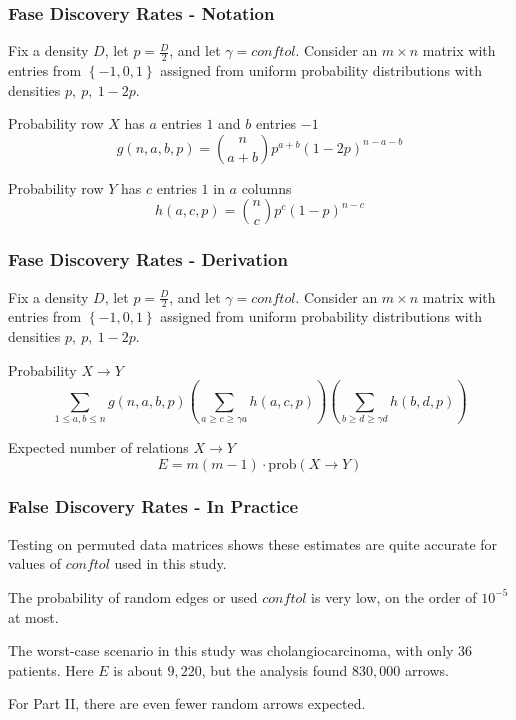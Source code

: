 \documentclass[
	11pt, %
]{beamer}
\begin{document}
\begin{frame}
    \frametitle{Fase Discovery Rates - Notation}
    Fix a density $D$, let $p=\frac{D}{2}$, and let $\gamma = conftol$. Consider an $m \times n$ matrix with entries from $\left\{ -1, 0, 1 \right\}$ assigned from uniform probability distributions with densities $p,\ p,\ 1-2p$.
    \smallskip
    \pause
    \begin{block}{Probability row $X$ has $a$ entries $1$ and $b$ entries $-1$}
        \begin{equation*}
            g(n,a,b,p) = \binom{n}{a+b}p^{a+b}(1-2p)^{n-a-b}
        \end{equation*}        
    \end{block}
    \begin{block}{Probability row $Y$ has $c$ entries $1$ in $a$ columns}
        \begin{equation*}
            h(a,c,p) = \binom{n}{c}p^{c}(1-p)^{n-c}
        \end{equation*}        
    \end{block}
\end{frame}

\begin{frame}
    \frametitle{Fase Discovery Rates - Derivation}
    Fix a density $D$, let $p=\frac{D}{2}$, and let $\gamma = conftol$. Consider an $m \times n$ matrix with entries from $\left\{ -1, 0, 1 \right\}$ assigned from uniform probability distributions with densities $p,\ p,\ 1-2p$.
    \pause
    \smallskip
    \begin{block}{Probability $X \rightarrow Y$}
        \begin{equation*}
            \sum_{1\leq a,b\leq n}g(n,a,b,p)\left( \sum_{a\geq c \geq \gamma a} h(a,c,p) \right)\left( \sum_{b\geq d \geq \gamma d} h(b,d,p) \right)
        \end{equation*}        
    \end{block}
    \pause
    \begin{block}{Expected number of relations $X \rightarrow Y$}
        \begin{equation*}
            E = m(m-1) \cdot \mathrm{prob}(X \rightarrow Y)
        \end{equation*}        
    \end{block}
\end{frame}

\begin{frame}
    \frametitle{False Discovery Rates - In Practice}
    Testing on permuted data matrices shows these estimates are quite accurate for values of $conftol$ used in this study.
    \pause
    \bigskip

    The probability of random edges or used $conftol$ is very low, on the order of $10^{-5}$ at most.
    \pause
    \bigskip

    The worst-case scenario in this study was cholangiocarcinoma, with only 36 patients. Here $E$ is about $9,220$, but the analysis found $830,000$ arrows.
    \pause
    \bigskip

    For Part II, there are even fewer random arrows expected.
\end{frame}
\end{document}
